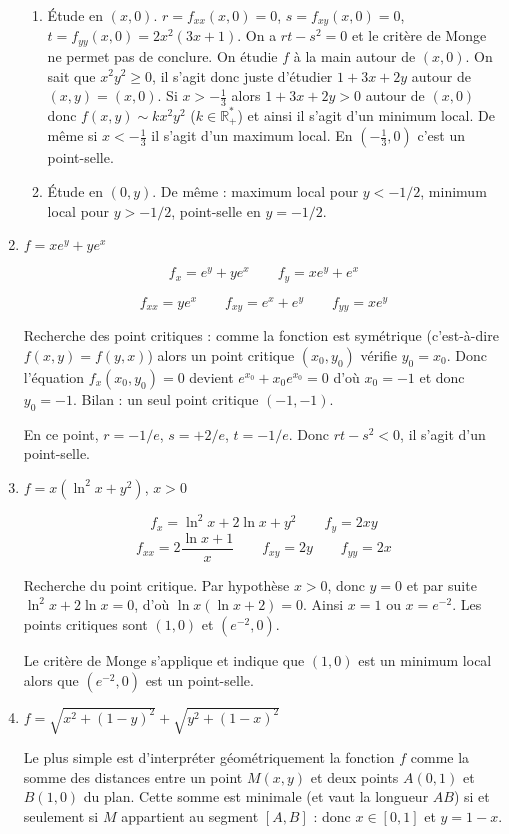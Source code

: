 \documentclass[11pt,a4paper]{article}
\newcommand{\Rr}{\mathbb{R}} \newcommand{\R}{\mathbb{R}}
\renewcommand{\ge}{\geqslant} \renewcommand{\geq}{\geqslant}
\theoremstyle{exostyle}
\begin{document}
\begin{enumerate}
\begin{enumerate}
	\item Étude en $(x,0)$.	
	$r = f_{xx}(x,0)= 0$, 
	$s = f_{xy}(x,0)= 0$, 
	$t = f_{yy}(x,0)= 2x^2(3x+1)$.
	On a $rt-s^2=0$ et le critère de Monge ne permet pas de conclure.
	On étudie $f$ à la main autour de $(x,0)$. On sait que $x^2y^2 \ge 0$, il s'agit donc juste d'étudier 
	$1+3x+2y$ autour de $(x,y)=(x,0)$. Si $x > -\frac13$ alors $1+3x+2y > 0$ autour de $(x,0)$ donc $f(x,y) \sim kx^2y^2$ ($k\in\Rr_+^*$) et ainsi il s'agit d'un minimum local. De même si $x < -\frac13$ il s'agit d'un maximum local.
	En $(-\frac13,0)$ c'est un point-selle.
	
	\item Étude en $(0,y)$.
	De même : maximum local pour $y<-1/2$, minimum local pour $y > -1/2$, point-selle en $y=-1/2$.
	
	\end{enumerate}
	
	

	
	
	\item $f = xe^y + ye^x$
	
	\[
	f_x = e^y + ye^x
	\qquad
	f_y = xe^y + e^x
	\]

	\[
	f_{xx} = ye^x
	\qquad 
	f_{xy}= e^x + e^y
	\qquad 
	f_{yy}= xe^y
	\]
	
	Recherche des point critiques : comme la fonction est symétrique (c'est-à-dire $f(x,y)=f(y,x)$) alors
	un point critique $(x_0,y_0)$ vérifie $y_0=x_0$. Donc l'équation $f_x(x_0,y_0) = 0$ devient $e^{x_0}+x_0e^{x_0}=0$ d'où $x_0=-1$ et donc $y_0=-1$. Bilan : un seul point critique $(-1,-1)$.
	
	En ce point, $r=-1/e$, $s= +2/e$, $t=-1/e$. Donc $rt-s^2 <0$, il s'agit d'un point-selle.
	
	
	\item $f = x(\ln^2x + y^2)$, $x>0$
	
	\[
	f_x = \ln^2x + 2\ln x + y^2
	\qquad
	f_y = 2xy
	\]
	\[
	f_{xx} = 2\frac{\ln x+1}{x}
	\qquad 
	f_{xy}= 2y
	\qquad 
	f_{yy}= 2x
	\]
	
	Recherche du point critique. Par hypothèse $x>0$, donc $y=0$ et par suite $\ln^2x + 2\ln x=0$,
	d'où $\ln x(\ln x+2)=0$. Ainsi $x=1$ ou $x= e^{-2}$. Les points critiques sont $(1,0)$ et $(e^{-2},0)$.
	
	Le critère de Monge s'applique et indique que  $(1,0)$ est un minimum local alors que $(e^{-2},0)$ est un point-selle.
	
	
	\item $f = \sqrt{x^2+(1-y)^2} + \sqrt{y^2+(1-x)^2}$
	
	Le plus simple est d'interpréter géométriquement la fonction $f$ comme la somme des distances entre un point $M(x,y)$ et deux points $A(0,1)$ et $B(1,0)$ du plan.
	Cette somme est minimale (et vaut la longueur $AB$) si et seulement si $M$ appartient au segment $[A,B]$ : donc $x \in[0,1]$ et $y=1-x$.
	
\end{enumerate}
\end{document}
